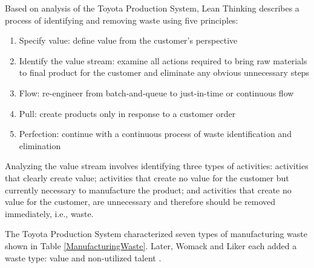 Based on analysis of the Toyota Production System, Lean Thinking \cite{WomackLeanThinking} describes a process of identifying and removing waste using five principles:
\begin{enumerate}
\item Specify value: define value from the customer's perspective
\item Identify the value stream: examine all actions required to bring raw materials to final product for the customer and eliminate any obvious unnecessary steps
\item Flow: re-engineer from batch-and-queue to just-in-time or continuous flow 
\item Pull: create products only in response to a customer order
\item Perfection: continue with a continuous process of waste identification and elimination
\end{enumerate}


Analyzing the value stream involves identifying three types of activities: activities that clearly create value; activities that create no value for the customer but currently necessary to manufacture the product; and activities that create no value for the customer, are unnecessary and therefore should be removed immediately, i.e., waste.


The Toyota Production System characterized seven types of manufacturing waste \cite{ShingoToyotaProductionSystem} shown in Table \ref{ManufacturingWaste}. Later, Womack and Liker each added a waste type: value and non-utilized talent \cite{WomackLeanThinking, LikerToyotaWay}.


